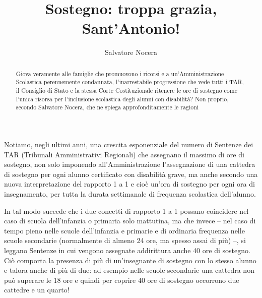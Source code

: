 \author{Salvatore Nocera}
\title{Sostegno: troppa grazia, Sant'Antonio!}
\label{cha:nocera050214}
\begin{abstract}
Giova veramente alle famiglie che promuovono i ricorsi e a un'Amministrazione Scolastica perennemente condannata, l'inarrestabile progressione che vede tutti i TAR, il Consiglio di Stato e la stessa Corte Costituzionale ritenere le ore di sostegno come l'unica risorsa per l'inclusione scolastica degli alunni con disabilità? Non proprio, secondo Salvatore Nocera, che ne spiega approfonditamente le ragioni
\end{abstract}
\maketitle
{}
Notiamo, negli ultimi anni, una crescita esponenziale del numero di Sentenze dei TAR (Tribunali Amministrativi Regionali) che assegnano il massimo di ore di sostegno, non solo imponendo all'Amministrazione l'assegnazione di una cattedra di sostegno per ogni alunno certificato con disabilità grave, ma anche secondo una nuova interpretazione del rapporto 1 a 1 e cioè un'ora di sostegno per ogni ora di insegnamento, per tutta la durata settimanale di frequenza scolastica dell'alunno.

In tal modo succede che i due concetti di rapporto 1 a 1 possano coincidere nel caso di scuola dell'infanzia o primaria solo mattutina, ma che invece – nel caso di tempo pieno nelle scuole dell'infanzia e primarie e di ordinaria frequenza nelle scuole secondarie (normalmente di almeno 24 ore, ma spesso assai di più) --, si leggano Sentenze in cui vengono assegnate addirittura anche 40 ore di sostegno. Ciò comporta la presenza di più di un'insegnante di sostegno con lo stesso alunno e talora anche di più di due: ad esempio nelle scuole secondarie una cattedra non può superare le 18 ore e quindi per coprire 40 ore di sostegno occorrono due cattedre e un quarto!

